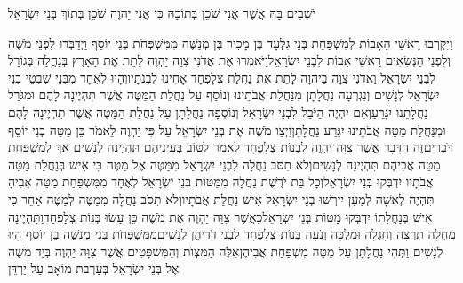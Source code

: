 \documentclass[../main/main.tex]{subfiles}
\begin{document}
\begin{multicols*}{\ncols}
יֹשְׁבִים בָּהּ אֲשֶׁר אֲנִי שֹׁכֵן בְּתוֹכָהּ כִּי אֲנִי יַהְוֶה שֹׁכֵן בְּתוֹךְ בְּנֵי יִשְׂרָאֵל\OpenSection{}\par
{}וַיִּקְרְבוּ רָאשֵׁי הָאָבוֹת לְמִשְׁפַּחַת בְּנֵי גִלְעָד בֶּן מָכִיר בֶּן מְנַשֶּׁה מִמִּשְׁפְּחֹת בְּנֵי יוֹסֵף וַיְדַבְּרוּ לִפְנֵי מֹשֶׁה וְלִפְנֵי הַנְּשִׂאִים רָאשֵׁי אָבוֹת לִבְנֵי יִשְׂרָאֵל\PreVerseSpace{}וַיֹּאמְרוּ אֶת אֲדֹנִי צִוָּה יַהְוֶה לָתֵת אֶת הָאָרֶץ בְּנַחֲלָה בְּגוֹרָל לִבְנֵי יִשְׂרָאֵל וַאדֹנִי צֻוָּה בַיהוָה לָתֵת אֶת נַחֲלַת צְלָפְחָד אָחִינוּ לִבְנֹתָיו\PreVerseSpace{}וְהָיוּ לְאֶחָד מִבְּנֵי שִׁבְטֵי בְנֵי יִשְׂרָאֵל לְנָשִׁים וְנִגְרְעָה נַחֲלָתָן מִנַּחֲלַת אֲבֹתֵינוּ וְנוֹסַף עַל נַחֲלַת הַמַּטֶּה אֲשֶׁר תִּהְיֶינָה לָהֶם וּמִגֹּרַל נַחֲלָתֵנוּ יִגָּרֵעַ\PreVerseSpace{}וְאִם יִהְיֶה הַיֹּבֵל לִבְנֵי יִשְׂרָאֵל וְנוֹסְפָה נַחֲלָתָן עַל נַחֲלַת הַמַּטֶּה אֲשֶׁר תִּהְיֶינָה לָהֶם וּמִנַּחֲלַת מַטֵּה אֲבֹתֵינוּ יִגָּרַע נַחֲלָתָן\PreVerseSpace{}וַיְצַו מֹשֶׁה אֶת בְּנֵי יִשְׂרָאֵל עַל פִּי יַהְוֶה לֵאמֹר כֵּן מַטֵּה בְנֵי יוֹסֵף דֹּבְרִים\PreVerseSpace{}זֶה הַדָּבָר אֲשֶׁר צִוָּה יַהְוֶה לִבְנוֹת צְלָפְחָד לֵאמֹר לַטּוֹב בְּעֵינֵיהֶם תִּהְיֶינָה לְנָשִׁים אַךְ לְמִשְׁפַּחַת מַטֵּה אֲבִיהֶם תִּהְיֶינָה לְנָשִׁים\PreVerseSpace{}וְלֹא תִסֹּב נַחֲלָה לִבְנֵי יִשְׂרָאֵל מִמַּטֶּה אֶל מַטֶּה כִּי אִישׁ בְּנַחֲלַת מַטֵּה אֲבֹתָיו יִדְבְּקוּ בְּנֵי יִשְׂרָאֵל\PreVerseSpace{}וְכָל בַּת יֹרֶשֶׁת נַחֲלָה מִמַּטּוֹת בְּנֵי יִשְׂרָאֵל לְאֶחָד מִמִּשְׁפַּחַת מַטֵּה אָבִיהָ תִּהְיֶה לְאִשָּׁה לְמַעַן יִירְשׁוּ בְּנֵי יִשְׂרָאֵל אִישׁ נַחֲלַת אֲבֹתָיו\PreVerseSpace{}וְלֹא תִסֹּב נַחֲלָה מִמַּטֶּה לְמַטֶּה אַחֵר כִּי אִישׁ בְּנַחֲלָתוֹ יִדְבְּקוּ מַטּוֹת בְּנֵי יִשְׂרָאֵל\PreVerseSpace{}כַּאֲשֶׁר צִוָּה יַהְוֶה אֶת מֹשֶׁה כֵּן עָשׂוּ בְּנוֹת צְלָפְחָד\PreVerseSpace{}וַתִּהְיֶינָה מַחְלָה תִרְצָה וְחָגְלָה וּמִלְכָּה וְנֹעָה בְּנוֹת צְלָפְחָד לִבְנֵי דֹדֵיהֶן לְנָשִׁים\PreVerseSpace{}מִמִּשְׁפְּחֹת בְּנֵי מְנַשֶּׁה בֶן יוֹסֵף הָיוּ לְנָשִׁים וַתְּהִי נַחֲלָתָן עַל מַטֵּה מִשְׁפַּחַת אֲבִיהֶן\PreVerseSpace{}אֵלֶּה הַמִּצְוֺת וְהַמִּשְׁפָּטִים אֲשֶׁר צִוָּה יַהְוֶה בְּיַד מֹשֶׁה אֶל בְּנֵי יִשְׂרָאֵל בְּעַרְבֹת מוֹאָב עַל יַרְדֵּן\par
\end{multicols*}
\end{document}
